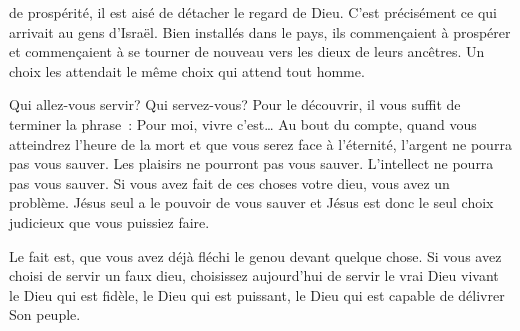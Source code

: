 




 de prospérité,
 il est aisé de détacher le regard de Dieu.
 C'est précisément ce qui arrivait au gens d'Israël.
 Bien installés dans le pays, ils commençaient à prospérer
 \ocadr et commençaient à se tourner de nouveau vers les dieux
 de leurs ancêtres.
 Un choix les attendait \ocadr le même choix qui attend tout homme.


Qui allez-vous servir? Qui servez-vous? Pour le découvrir,
 il vous suffit de terminer la phrase~:
 \og Pour moi, vivre c'est\dots{} \fg{}
 Au bout du compte, quand vous atteindrez l'heure de la mort
 et que vous serez face à l'éternité, l'argent ne pourra pas vous sauver.
 Les plaisirs ne pourront pas vous sauver.
 L'intellect ne pourra pas vous sauver.
 Si vous avez fait de ces choses votre dieu, vous avez un problème.
 Jésus seul a le pouvoir de vous sauver
 et Jésus est donc le seul choix judicieux que vous puissiez faire.

Le fait est, que vous avez déjà fléchi le genou devant quelque chose.
 Si vous avez choisi de servir un faux dieu,
 choisissez aujourd'hui de servir le vrai Dieu vivant
 \ocadr le Dieu qui est fidèle, le Dieu qui est puissant,
 le Dieu qui est capable de délivrer Son peuple. 

\dvrule




